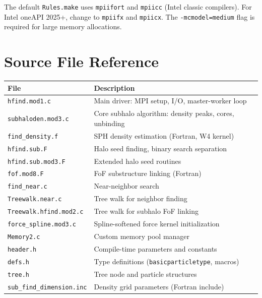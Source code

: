 \documentclass[11pt,fleqn]{book}
\newcommand{\code}[1]{\texttt{#1}}
\newcommand{\file}[1]{\texttt{#1}}
\begin{document}
\begin{remark}
The default \file{Rules.make} uses \code{mpiifort} and \code{mpiicc} (Intel classic compilers).  For Intel oneAPI 2025+, change to \code{mpiifx} and \code{mpiicx}.  The \code{-mcmodel=medium} flag is required for large memory allocations.
\end{remark}

\section{Source File Reference}

\begin{longtable}{L{5.5cm} L{8cm}}
\toprule
\textbf{File} & \textbf{Description} \\
\midrule
\endhead
\file{hfind.mod1.c}           & Main driver: MPI setup, I/O, master-worker loop \\
\file{subhaloden.mod3.c}      & Core subhalo algorithm: density peaks, cores, unbinding \\
\file{find\_density.f}        & SPH density estimation (Fortran, W4 kernel) \\
\file{hfind.sub.F}            & Halo seed finding, binary search separation \\
\file{hfind.sub.mod3.F}       & Extended halo seed routines \\
\file{fof.mod8.F}             & FoF substructure linking (Fortran) \\
\file{find\_near.c}           & Near-neighbor search \\
\file{Treewalk.near.c}        & Tree walk for neighbor finding \\
\file{Treewalk.hfind.mod2.c}  & Tree walk for subhalo FoF linking \\
\file{force\_spline.mod3.c}   & Spline-softened force kernel initialization \\
\file{Memory2.c}              & Custom memory pool manager \\
\file{header.h}               & Compile-time parameters and constants \\
\file{defs.h}                 & Type definitions (\code{basicparticletype}, macros) \\
\file{tree.h}                 & Tree node and particle structures \\
\file{sub\_find\_dimension.inc} & Density grid parameters (Fortran include) \\
\bottomrule
\end{longtable}
\end{document}
